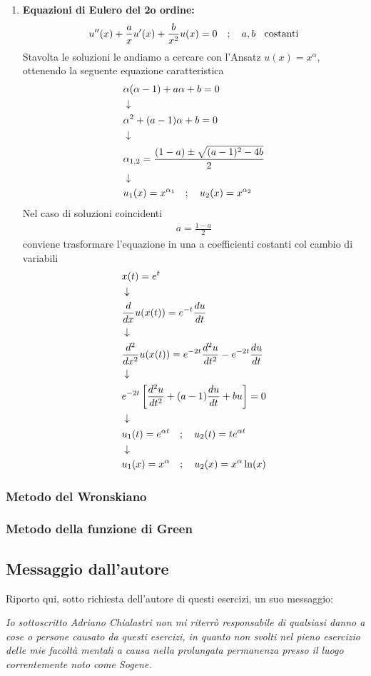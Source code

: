 \begin{enumerate}
	\item \textbf{Equazioni di Eulero del 2o ordine:}
	\begin{align}
		u''(x) + \frac{a}{x}u'(x) + \frac{b}{x^2}u(x) = 0 \quad ; \quad a,b \;\;\ \text{costanti}
	\end{align}
	Stavolta le soluzioni le andiamo a cercare con l'Ansatz $u(x) = x^\alpha$, ottenendo la seguente equazione caratteristica
	\begin{align}
		&\alpha (\alpha - 1) + a\alpha + b = 0 \\ &\downarrow \nonumber \\
		&\alpha^2 + (a-1)\alpha + b = 0 \nonumber \\ &\downarrow \nonumber \\
		&\alpha_{1,2} = \frac{(1-a) \pm \sqrt{(a-1)^2 - 4b}}{2} \\ &\downarrow \nonumber \\
		&u_1 (x) = x^{\alpha_1} \quad ; \quad u_2 (x) = x^{\alpha_2}
	\end{align}
	Nel caso di soluzioni coincidenti
	\begin{align}
		a = \frac{1-a}{2}
	\end{align}
	conviene trasformare l'equazione in una a coefficienti costanti col cambio di variabili
	\begin{align}
		&x(t) = e^t\\ &\downarrow \nonumber \\
		&\frac{d}{dx}u(x(t)) =e^{-t} \frac{du}{dt} \nonumber \\ &\downarrow \nonumber \\
		&\frac{d^2}{dx^2}u(x(t)) =e^{-2t} \frac{d^2u}{dt^2} - e^{-2t} \frac{du}{dt} \nonumber \\ &\downarrow \nonumber \\
		&e^{-2t} \left[ \frac{d^2u}{dt^2} + (a-1)\frac{du}{dt} + bu \right] = 0 \nonumber \\ &\downarrow \nonumber \\
		&u_1(t) = e^{\alpha t} \quad ; \quad u_2(t) = te^{\alpha t} \nonumber \\ &\downarrow \nonumber \\
		&u_1(x) = x^\alpha \quad ; \quad u_2(x) = x^\alpha \ln(x)
	\end{align}
\end{enumerate}

\newpage

\subsubsection{Metodo del Wronskiano}


\subsubsection{Metodo della funzione di Green}


\newpage

\subsection{Messaggio dall'autore}

Riporto qui, sotto richiesta dell'autore di questi esercizi, un suo messaggio:

\textit{Io sottoscritto Adriano Chialastri non mi riterrò responsabile di qualsiasi danno a cose o persone causato da questi esercizi, in quanto non svolti nel pieno esercizio delle mie facoltà mentali a causa nella prolungata permanenza presso il luogo correntemente noto come Sogene.
}

